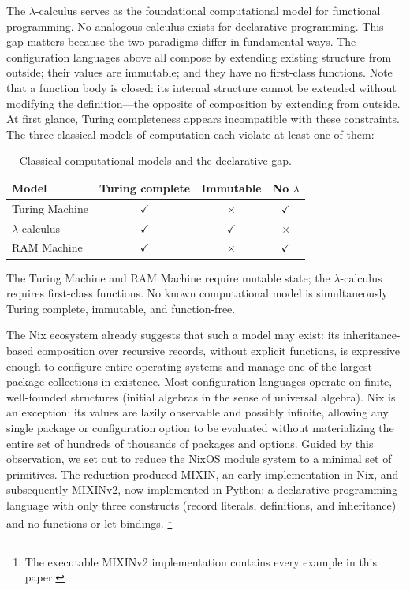 The $\lambda$-calculus serves as the foundational computational model for
functional programming. No analogous calculus exists for declarative
programming. This gap matters because the two paradigms differ in
fundamental ways.
The configuration languages above all compose by extending
existing structure from outside; their values are immutable;
and they have no first-class functions.
Note that a function body is closed: its internal structure
cannot be extended without modifying the definition---the
opposite of composition by extending from outside.
At first glance, Turing completeness appears incompatible
with these constraints. The three classical models of computation each
violate at least one of them:

\begin{table}[h]
  \centering
  \begin{tabular}{lccc}
    \textbf{Model} & \textbf{Turing complete} & \textbf{Immutable} & \textbf{No $\lambda$} \\
    \hline
    Turing Machine     & $\checkmark$ & $\times$     & $\checkmark$ \\
    $\lambda$-calculus & $\checkmark$ & $\checkmark$ & $\times$ \\
    RAM Machine        & $\checkmark$ & $\times$     & $\checkmark$ \\
  \end{tabular}
  \caption{Classical computational models and the declarative gap.}
  \label{tab:computational-models}
\end{table}

\noindent
The Turing Machine and RAM Machine require mutable state;
the $\lambda$-calculus requires first-class functions.
No known computational model is simultaneously Turing complete,
immutable, and function-free.

The Nix ecosystem already suggests that such a model may exist:
its inheritance-based composition over recursive records, without
explicit functions, is expressive enough to configure entire
operating systems and manage one of the largest package
collections in existence.
Most configuration languages operate on finite, well-founded
structures (initial algebras in the sense of universal algebra).
Nix is an exception: its values are lazily observable
and possibly infinite, allowing any single package or
configuration option to be evaluated without materializing the
entire set of hundreds of thousands of packages and options.
Guided by this observation, we set out to reduce the
NixOS module system to a minimal set of primitives.
The reduction produced MIXIN, an early implementation in Nix,
and subsequently
MIXINv2, now implemented in Python: a declarative programming
language with only three constructs (record literals, definitions,
and inheritance) and no functions or let-bindings.%
\footnote{
  The executable MIXINv2
  implementation contains every example in this paper.
}

